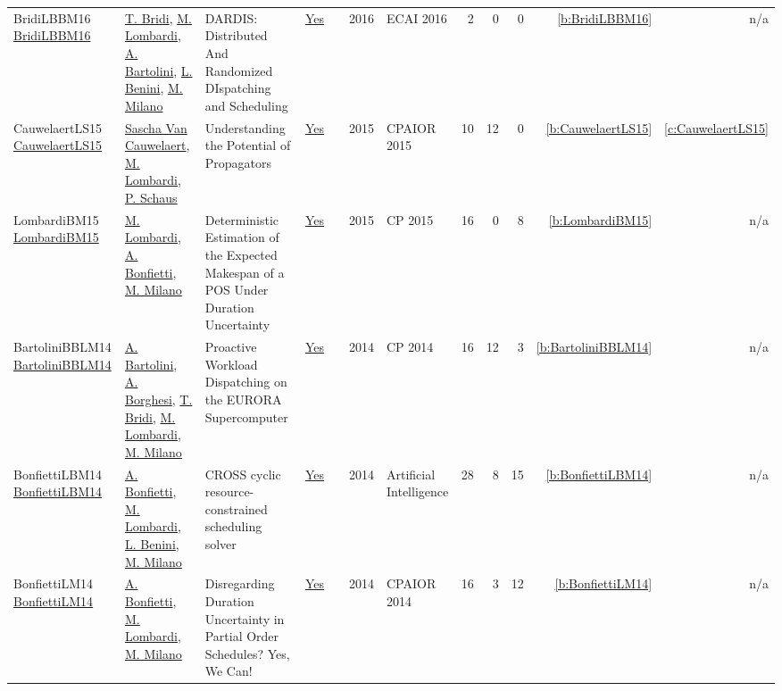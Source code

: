 {\begin{longtable}{>{\raggedright\arraybackslash}p{3cm}>{\raggedright\arraybackslash}p{6cm}>{\raggedright\arraybackslash}p{6.5cm}rrrp{2.5cm}rrrrr}
BridiLBBM16 \href{https://doi.org/10.3233/978-1-61499-672-9-1598}{BridiLBBM16} & \hyperref[auth:a232]{T. Bridi}, \hyperref[auth:a143]{M. Lombardi}, \hyperref[auth:a230]{A. Bartolini}, \hyperref[auth:a247]{L. Benini}, \hyperref[auth:a144]{M. Milano} & {DARDIS:} Distributed And Randomized DIspatching and Scheduling & \href{../works/BridiLBBM16.pdf}{Yes} & \cite{BridiLBBM16} & 2016 & ECAI 2016 & 2 & 0 & 0 & \ref{b:BridiLBBM16} & n/a\\
CauwelaertLS15 \href{https://doi.org/10.1007/978-3-319-18008-3_29}{CauwelaertLS15} & \hyperref[auth:a206]{Sascha Van Cauwelaert}, \hyperref[auth:a143]{M. Lombardi}, \hyperref[auth:a148]{P. Schaus} & Understanding the Potential of Propagators & \href{../works/CauwelaertLS15.pdf}{Yes} & \cite{CauwelaertLS15} & 2015 & CPAIOR 2015 & 10 & 12 & 0 & \ref{b:CauwelaertLS15} & \ref{c:CauwelaertLS15}\\
LombardiBM15 \href{https://doi.org/10.1007/978-3-319-23219-5_20}{LombardiBM15} & \hyperref[auth:a143]{M. Lombardi}, \hyperref[auth:a203]{A. Bonfietti}, \hyperref[auth:a144]{M. Milano} & Deterministic Estimation of the Expected Makespan of a {POS} Under Duration Uncertainty & \href{../works/LombardiBM15.pdf}{Yes} & \cite{LombardiBM15} & 2015 & CP 2015 & 16 & 0 & 8 & \ref{b:LombardiBM15} & n/a\\
BartoliniBBLM14 \href{https://doi.org/10.1007/978-3-319-10428-7_55}{BartoliniBBLM14} & \hyperref[auth:a230]{A. Bartolini}, \hyperref[auth:a231]{A. Borghesi}, \hyperref[auth:a232]{T. Bridi}, \hyperref[auth:a143]{M. Lombardi}, \hyperref[auth:a144]{M. Milano} & Proactive Workload Dispatching on the {EURORA} Supercomputer & \href{../works/BartoliniBBLM14.pdf}{Yes} & \cite{BartoliniBBLM14} & 2014 & CP 2014 & 16 & 12 & 3 & \ref{b:BartoliniBBLM14} & n/a\\
BonfiettiLBM14 \href{https://doi.org/10.1016/j.artint.2013.09.006}{BonfiettiLBM14} & \hyperref[auth:a203]{A. Bonfietti}, \hyperref[auth:a143]{M. Lombardi}, \hyperref[auth:a247]{L. Benini}, \hyperref[auth:a144]{M. Milano} & {CROSS} cyclic resource-constrained scheduling solver & \href{../works/BonfiettiLBM14.pdf}{Yes} & \cite{BonfiettiLBM14} & 2014 & Artificial Intelligence & 28 & 8 & 15 & \ref{b:BonfiettiLBM14} & n/a\\
BonfiettiLM14 \href{https://doi.org/10.1007/978-3-319-07046-9_15}{BonfiettiLM14} & \hyperref[auth:a203]{A. Bonfietti}, \hyperref[auth:a143]{M. Lombardi}, \hyperref[auth:a144]{M. Milano} & Disregarding Duration Uncertainty in Partial Order Schedules? Yes, We Can! & \href{../works/BonfiettiLM14.pdf}{Yes} & \cite{BonfiettiLM14} & 2014 & CPAIOR 2014 & 16 & 3 & 12 & \ref{b:BonfiettiLM14} & n/a\\

\end{longtable}}
